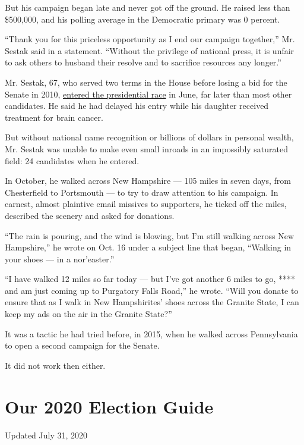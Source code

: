But his campaign began late and never got off the ground. He raised less
than \$500,000, and his polling average in the Democratic primary was 0
percent.

``Thank you for this priceless opportunity as I end our campaign
together,'' Mr. Sestak said in a statement. ``Without the privilege of
national press, it is unfair to ask others to husband their resolve and
to sacrifice resources any longer.''

Mr. Sestak, 67, who served two terms in the House before losing a bid
for the Senate in 2010,
\href{https://www.nytimes.com/2019/06/23/us/joe-sestak-2020-candidates.html}{entered
the presidential race} in June, far later than most other candidates. He
said he had delayed his entry while his daughter received treatment for
brain cancer.

But without national name recognition or billions of dollars in personal
wealth, Mr. Sestak was unable to make even small inroads in an
impossibly saturated field: 24 candidates when he entered.

In October, he walked across New Hampshire --- 105 miles in seven days,
from Chesterfield to Portsmouth --- to try to draw attention to his
campaign. In earnest, almost plaintive email missives to supporters, he
ticked off the miles, described the scenery and asked for donations.

``The rain is pouring, and the wind is blowing, but I'm still walking
across New Hampshire,'' he wrote on Oct. 16 under a subject line that
began, ``Walking in your shoes --- in a nor'easter.''

``I have walked 12 miles so far today --- but I've got another 6 miles
to go, **** and am just coming up to Purgatory Falls Road,'' he wrote.
``Will you donate to ensure that as I walk in New Hampshirites' shoes
across the Granite State, I can keep my ads on the air in the Granite
State?''

It was a tactic he had tried before, in 2015, when he walked across
Pennsylvania to open a second campaign for the Senate.

It did not work then either.

\hypertarget{our-2020-election-guide}{%
\section{Our 2020 Election Guide}\label{our-2020-election-guide}}

Updated July 31, 2020

